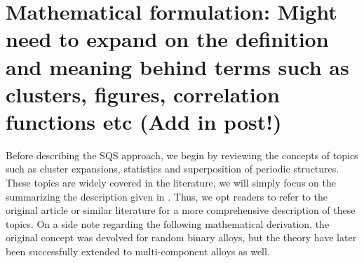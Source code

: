 \section{Mathematical formulation: Might need to expand on the definition and meaning behind terms such as clusters, figures, correlation functions etc (Add in post!)}
Before describing the SQS approach, we begin by reviewing the concepts of topics such as cluster expansions, statistics and superposition of periodic structures. These topics are widely covered in the literature, we will simply focus on the summarizing the description given in \cite{sqsfull}. Thus, we opt readers to refer to the original article or similar literature for a more comprehensive description of these topics. On a side note regarding the following mathematical derivation, the original concept was devolved for random binary alloys, but the theory have later been successfully extended to multi-component alloys as well. 

